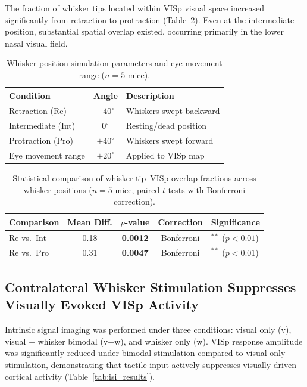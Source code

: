 \documentclass[11pt]{article}
\begin{document}
The fraction of whisker tips located within VISp visual space increased significantly from retraction to protraction (Table~\ref{tab:overlap_stats}). Even at the intermediate position, substantial spatial overlap existed, occurring primarily in the lower nasal visual field.

\begin{table}[H]
\centering
\caption{Whisker position simulation parameters and eye movement range ($n = 5$ mice).}
\label{tab:whisker_params}
\begin{tabular}{lcl}
\toprule
\textbf{Condition} & \textbf{Angle} & \textbf{Description} \\
\midrule
Retraction (Re) & $-40^\circ$ & Whiskers swept backward \\
Intermediate (Int) & $0^\circ$ & Resting/dead position \\
Protraction (Pro) & $+40^\circ$ & Whiskers swept forward \\
Eye movement range & $\pm 20^\circ$ & Applied to VISp map \\
\bottomrule
\end{tabular}
\end{table}

\begin{table}[H]
\centering
\caption{Statistical comparison of whisker tip--VISp overlap fractions across whisker positions ($n = 5$ mice, paired $t$-tests with Bonferroni correction).}
\label{tab:overlap_stats}
\begin{tabular}{lcccl}
\toprule
\textbf{Comparison} & \textbf{Mean Diff.} & \textbf{$p$-value} & \textbf{Correction} & \textbf{Significance} \\
\midrule
Re vs.\ Int & 0.18 & \textbf{0.0012} & Bonferroni & $^{**}$ ($p < 0.01$) \\
Re vs.\ Pro & 0.31 & \textbf{0.0047} & Bonferroni & $^{**}$ ($p < 0.01$) \\
\bottomrule
\end{tabular}
\end{table}

\subsection{Contralateral Whisker Stimulation Suppresses Visually Evoked VISp Activity}

Intrinsic signal imaging was performed under three conditions: visual only (v), visual + whisker bimodal (v+w), and whisker only (w). VISp response amplitude was significantly reduced under bimodal stimulation compared to visual-only stimulation, demonstrating that tactile input actively suppresses visually driven cortical activity (Table~\ref{tab:isi_results}).
\end{document}
